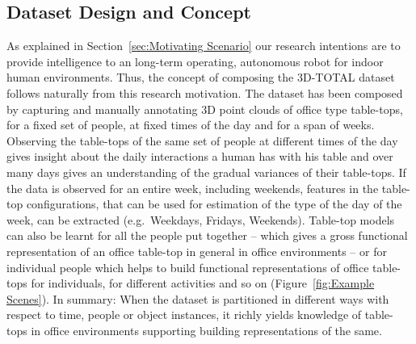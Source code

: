 \documentclass[letterpaper, 10 pt, conference]{ieeeconf}  %
\begin{document}
\subsection{Dataset Design and Concept}
\label{ssec:Dataset Design and Concept}
As explained in Section~\ref{sec:Motivating Scenario} our research intentions are to provide intelligence to an long-term operating, 
autonomous robot for indoor human environments. Thus, the concept of composing the 3D-TOTAL dataset follows naturally from this research 
motivation. The dataset has been composed by capturing and manually annotating 3D point clouds of office type table-tops, for a fixed set of 
people, at fixed times of the 
day and for a span of weeks. Observing the table-tops of the same set of people at different times of the day gives insight about the daily 
interactions a human has with his table and over many days gives an understanding of the gradual variances of their table-tops. If the data 
is observed for an entire week, including weekends, features in the table-top configurations, that can be used for estimation of the type of 
the day of the week, can be extracted (e.g.\ Weekdays, Fridays, Weekends). Table-top models can also be learnt for all the people put 
together -- which gives a gross functional representation of an office table-top in general in office environments -- or for individual 
people which helps to build functional representations of office table-tops for individuals, for different activities and so on 
(Figure~\ref{fig:Example Scenes}). 
In summary: When the dataset is partitioned in different ways with respect to time, people or object instances, it richly yields knowledge 
of table-tops in office environments supporting building representations of the same.
\end{document}
